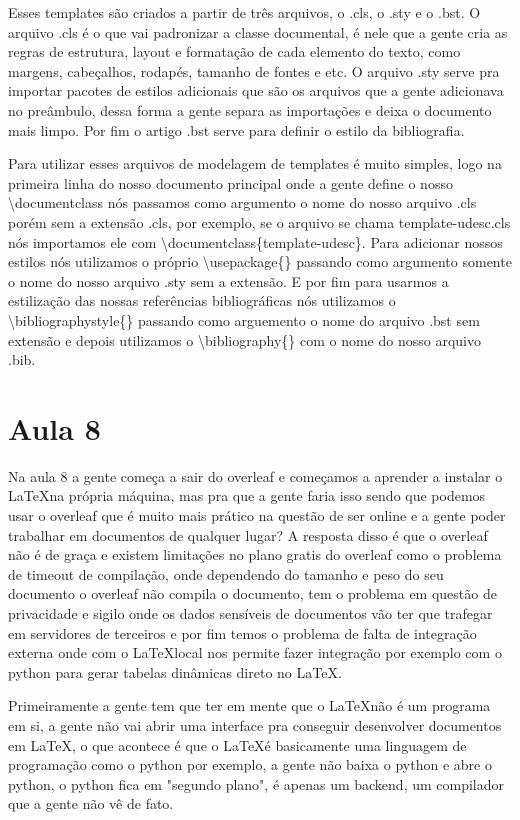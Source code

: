 Esses templates são criados a partir de três arquivos, o .cls, o .sty e o .bst. O arquivo .cls é o que vai padronizar a classe documental, é nele que a gente cria as regras de estrutura, layout e formatação de cada elemento do texto, como margens, cabeçalhos, rodapés, tamanho de fontes e etc. O arquivo .sty serve pra importar pacotes de estilos adicionais que são os arquivos que a gente adicionava no preâmbulo, dessa forma a gente separa as importações e deixa o documento mais limpo. Por fim o artigo .bst serve para definir o estilo da bibliografia.

Para utilizar esses arquivos de modelagem de templates é muito simples, logo na primeira linha do nosso documento principal onde a gente define o nosso \textbackslash documentclass nós passamos como argumento o nome do nosso arquivo .cls porém sem a extensão .cls, por exemplo, se o arquivo se chama template-udesc.cls nós importamos ele com \textbackslash documentclass\{template-udesc\}. Para adicionar nossos estilos nós utilizamos o próprio \textbackslash usepackage\{\} passando como argumento somente o nome do nosso arquivo .sty sem a extensão. E por fim para usarmos a estilização das nossas referências bibliográficas nós utilizamos o \textbackslash bibliographystyle\{\} passando como arguemento o nome do arquivo .bst sem extensão e depois utilizamos o \textbackslash bibliography\{\} com o nome do nosso arquivo .bib.



\section{Aula 8}
Na aula 8 a gente começa a sair do overleaf e começamos a aprender a instalar o \LaTeX na própria máquina, mas pra que a gente faria isso sendo que podemos usar o overleaf que é muito mais prático na questão de ser online e a gente poder trabalhar em documentos de qualquer lugar? A resposta disso é que o overleaf não é de graça e existem limitações no plano gratis do overleaf como o problema de timeout de compilação, onde dependendo do tamanho e peso do seu documento o overleaf não compila o documento, tem o problema em questão de privacidade e sigilo onde os dados sensíveis de documentos vão ter que trafegar em servidores de terceiros e por fim temos o problema de falta de integração externa onde com o \LaTeX local nos permite fazer integração por exemplo com o python para gerar tabelas dinâmicas direto no \LaTeX.

Primeiramente a gente tem que ter em mente que o \LaTeX não é um programa em si, a gente não vai abrir uma interface pra conseguir desenvolver documentos em \LaTeX, o que acontece é que o \LaTeX é basicamente uma linguagem de programação como o python por exemplo, a gente não baixa o python e abre o python, o python fica em "segundo plano", é apenas um backend, um compilador que a gente não vê de fato.

